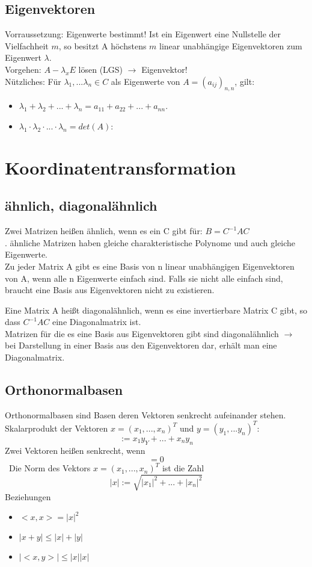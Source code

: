 \documentclass[12pt,a4paper]{article}
\begin{document}
\subsection{Eigenvektoren}
Vorraussetzung: Eigenwerte bestimmt! Ist ein Eigenwert eine Nullstelle der Vielfachheit $m$, so besitzt A höchstens $m$ linear unabhängige Eigenvektoren zum Eigenwert $\lambda$.\\
Vorgehen: $A-\lambda_x E$ lösen (LGS) $\rightarrow$ Eigenvektor!\\
Nützliches:
Für $\lambda_1,...\lambda_n \in C$ als Eigenwerte von $A = (a_{ij})_{n,n}$, gilt: 
\begin{itemize}
\item
$\lambda_1 + \lambda_2 + ... + \lambda_n = a_{11} + a_{22} + ... + a_{nn}$.
\item
$\lambda_1\cdot\lambda_2\cdot...\cdot\lambda_n = det(A)$:
\end{itemize}

\section{Koordinatentransformation}
\subsection{ähnlich, diagonalähnlich}
Zwei Matrizen heißen ähnlich, wenn es ein C gibt für: $B = C^{-1}AC$\\.
ähnliche Matrizen haben gleiche charakteristische Polynome und auch gleiche Eigenwerte.\\
Zu jeder Matrix A gibt es eine Basis von n linear unabhängigen Eigenvektoren von A, wenn alle n Eigenwerte einfach sind. Falls sie nicht alle einfach sind, braucht eine Basis aus Eigenvektoren nicht zu existieren.

Eine Matrix A heißt diagonalähnlich, wenn es eine invertierbare Matrix C gibt, so dass $C^{-1} AC$ eine Diagonalmatrix ist.\\
Matrizen für die es eine Basis aus Eigenvektoren gibt sind diagonalähnlich $\rightarrow$ bei Darstellung in einer Basis aus den Eigenvektoren dar, erhält man eine Diagonalmatrix.

\subsection{Orthonormalbasen}
Orthonormalbasen sind Basen deren Vektoren senkrecht aufeinander stehen.
Skalarprodukt der Vektoren $ x = (x_1, ..., x_n)^T$ und $y = (y_1,...y_n)^T$:
\[<x,y> := x_1y_Y + ... + x_n y_n\]
Zwei Vektoren heißen senkrecht, wenn \[<x,y> = 0\]\
Die Norm des Vektors $ x = (x_1,...,x_n)^T$ ist die Zahl \[|x| := \sqrt{|x_1|^2+...+|x_n|^2}\]
Beziehungen
\begin{itemize}
\item
$<x,x> = |x|^2$
\item
$|x+y| \leq |x| + |y|$
\item
$|<x,y>| \leq |x| |x|$
\end{itemize}
\end{document}
